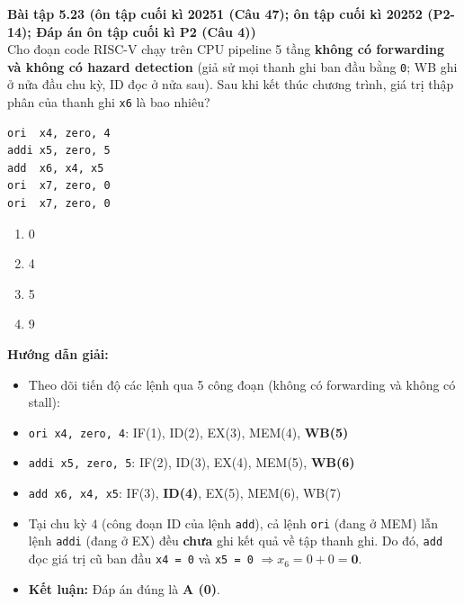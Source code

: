 \textbf{Bài tập 5.23 (ôn tập cuối kì 20251 (Câu 47); ôn tập cuối kì 20252 (P2-14); Đáp án ôn tập cuối kì P2 (Câu 4))}\\
Cho đoạn code RISC-V chạy trên CPU pipeline 5 tầng \textbf{không có forwarding và không có hazard detection} (giả sử mọi thanh ghi ban đầu bằng \texttt{0}; WB ghi ở nửa đầu chu kỳ, ID đọc ở nửa sau). Sau khi kết thúc chương trình, giá trị thập phân của thanh ghi \texttt{x6} là bao nhiêu?
\begin{lstlisting}
ori  x4, zero, 4
addi x5, zero, 5
add  x6, x4, x5
ori  x7, zero, 0
ori  x7, zero, 0
\end{lstlisting}
\begin{enumerate}[label=\Alph*.]
    \item 0
    \item 4
    \item 5
    \item 9
\end{enumerate}
\textbf{Hướng dẫn giải:}
\begin{itemize}
    \item Theo dõi tiến độ các lệnh qua 5 công đoạn (không có forwarding và không có stall):
    \item \texttt{ori x4, zero, 4}: IF(1), ID(2), EX(3), MEM(4), \textbf{WB(5)}
    \item \texttt{addi x5, zero, 5}: IF(2), ID(3), EX(4), MEM(5), \textbf{WB(6)}
    \item \texttt{add x6, x4, x5}: IF(3), \textbf{ID(4)}, EX(5), MEM(6), WB(7)
    \item Tại chu kỳ $4$ (công đoạn ID của lệnh \texttt{add}), cả lệnh \texttt{ori} (đang ở MEM) lẫn lệnh \texttt{addi} (đang ở EX) đều \textbf{chưa} ghi kết quả về tập thanh ghi. Do đó, \texttt{add} đọc giá trị cũ ban đầu \texttt{x4 = 0} và \texttt{x5 = 0} $\Rightarrow x_6 = 0 + 0 = \mathbf{0}$.
    \item \textbf{Kết luận:} Đáp án đúng là \textbf{A (0)}.
\end{itemize}

